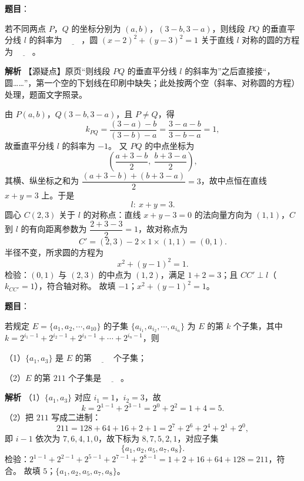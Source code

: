 \begin{answer}

\textbf{题目}：

若不同两点 $P$，$Q$ 的坐标分别为 $(a,b)$，$(3-b,3-a)$，则线段 $PQ$ 的垂直平分线 $l$ 的斜率为 $\underline{\qquad}$，圆 $(x-2)^2+(y-3)^2=1$ 关于直线 $l$ 对称的圆的方程为 $\underline{\qquad}$。

\textbf{解析}
【源疑点】原页“则线段 $PQ$ 的垂直平分线 $l$ 的斜率为”之后直接接“，圆……”，第一个空的下划线在印刷中缺失；此处按两个空（斜率、对称圆的方程）处理，题面文字照录。

由 $P(a,b)$，$Q(3-b,3-a)$，且 $P\neq Q$，得
\nopagebreak[4]
\[k_{PQ}=\frac{(3-a)-b}{(3-b)-a}=\frac{3-a-b}{3-b-a}=1,\]
故垂直平分线 $l$ 的斜率为 $-1$。
又 $PQ$ 的中点坐标为
\nopagebreak[4]
\[\left(\frac{a+3-b}{2},\ \frac{b+3-a}{2}\right),\]
其横、纵坐标之和为 $\dfrac{(a+3-b)+(b+3-a)}{2}=3$，故中点恒在直线 $x+y=3$ 上。于是
\nopagebreak[4]
\[l:\ x+y=3.\]
圆心 $C(2,3)$ 关于 $l$ 的对称点：直线 $x+y-3=0$ 的法向量方向为 $(1,1)$，$C$ 到 $l$ 的有向距离参数为 $\dfrac{2+3-3}{2}=1$，故对称点为
\nopagebreak[4]
\[C'=(2,3)-2\times1\times(1,1)=(0,1).\]
半径不变，所求圆的方程为
\nopagebreak[4]
\[x^2+(y-1)^2=1.\]
检验：$(0,1)$ 与 $(2,3)$ 的中点为 $(1,2)$，满足 $1+2=3$；且 $CC'\perp l$（$k_{CC'}=1$），符合轴对称。
故填 $-1$；$x^2+(y-1)^2=1$。


\end{answer}
\begin{answer}

\textbf{题目}：

若规定 $E=\{a_1,a_2,\cdots,a_{10}\}$ 的子集 $\{a_{i_1},a_{i_2},\cdots,a_{i_n}\}$ 为 $E$ 的第 $k$ 个子集，其中 $k=2^{i_1-1}+2^{i_2-1}+2^{i_3-1}+\cdots+2^{i_n-1}$，则

（1）$\{a_1,a_3\}$ 是 $E$ 的第 $\underline{\qquad}$ 个子集；

（2）$E$ 的第 $211$ 个子集是 $\underline{\qquad}$。

\textbf{解析}
（1）$\{a_1,a_3\}$ 对应 $i_1=1$，$i_2=3$，故
\nopagebreak[4]
\[k=2^{1-1}+2^{3-1}=2^0+2^2=1+4=5.\]
（2）把 $211$ 写成二进制：
\nopagebreak[4]
\[211=128+64+16+2+1=2^7+2^6+2^4+2^1+2^0,\]
即 $i-1$ 依次为 $7,6,4,1,0$，故下标为 $8,7,5,2,1$，对应子集
\nopagebreak[4]
\[\{a_1,a_2,a_5,a_7,a_8\}.\]
检验：$2^{1-1}+2^{2-1}+2^{5-1}+2^{7-1}+2^{8-1}=1+2+16+64+128=211$，符合。
故填 $5$；$\{a_1,a_2,a_5,a_7,a_8\}$。


\end{answer}
